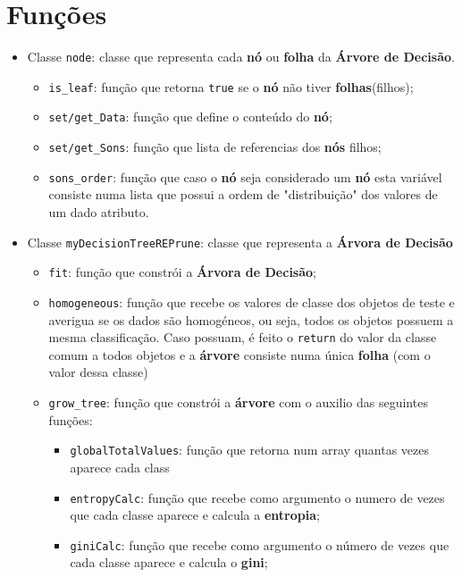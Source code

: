 \documentclass[11pt]{article}   %
\begin{document}
\section{Funções}
\begin{itemize}
    \item Classe \verb|node|: classe que representa cada \textbf{nó} ou \textbf{folha} da \textbf{Árvore de Decisão}.
    \begin{itemize}
        \item \verb|is_leaf|: função que retorna \verb|true| se o \textbf{nó} não tiver \textbf{folhas}(filhos);
        \item \verb|set/get_Data|: função que define o conteúdo do \textbf{nó};
        \item \verb|set/get_Sons|: função que lista de referencias dos \textbf{nós} filhos;
        \item \verb|sons_order|: função que caso o \textbf{nó} seja considerado um \textbf{nó} esta variável consiste numa lista que possui a ordem de "distribuição" dos valores de um dado atributo.
    \end{itemize}
    \item Classe \verb|myDecisionTreeREPrune|: classe que representa a \textbf{Árvora de Decisão}
    \begin{itemize}
        \item \verb|fit|: função que constrói a \textbf{Árvora de Decisão};
        \item \verb|homogeneous|: função que recebe os valores de classe dos objetos de teste
        e averigua se os dados são homogéneos, ou seja, todos os objetos possuem a mesma classificação.
        Caso possuam, é feito o \verb|return| do valor da classe comum a todos objetos e a \textbf{árvore} consiste numa única \textbf{folha} 
        (com o valor dessa classe)
        \item \verb|grow_tree|: função que constrói a \textbf{árvore} com o auxilio das seguintes funções:
        \begin{itemize}
            \item \verb|globalTotalValues|: função que retorna num array quantas vezes aparece cada class
            \item \verb|entropyCalc|: função que recebe como argumento o numero de vezes que cada classe aparece e calcula a \textbf{entropia};
            \item \verb|giniCalc|: função que recebe como argumento o número de vezes que cada classe aparece e calcula o \textbf{gini};

\end{itemize}
\end{itemize}
\end{itemize}
\end{document}
